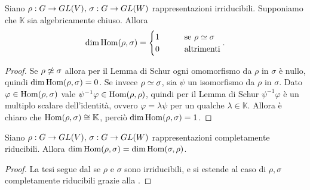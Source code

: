 \begin{corollary}
Siano $\rho:G\to GL(V),\,\allowbreak\sigma:G\to GL(W)$ rappresentazioni irriducibili. Supponiamo che $\mathbb{K}$ sia algebricamente chiuso. Allora
$$
\dim\operatorname{Hom}(\rho,\sigma)=
\begin{cases}
1\qquad&\text{se $\rho\simeq\sigma$}\\
0\qquad&\text{altrimenti}
\end{cases}.
$$
\end{corollary}
\begin{proof}
Se $\rho\not\simeq\sigma$ allora per il Lemma di Schur ogni omomorfismo da $\rho$ in $\sigma$ è nullo, quindi $\dim\operatorname{Hom}(\rho,\sigma)=0$. Se invece $\rho\simeq\sigma$, sia $\psi$ un isomorfismo da $\rho$ in $\sigma$. Dato $\varphi\in\operatorname{Hom}(\rho,\sigma)$ vale $\psi^{-1}\varphi\in\operatorname{Hom}(\rho,\rho)$, quindi per il Lemma di Schur $\psi^{-1}\varphi$ è un multiplo scalare dell'identità, ovvero $\varphi=\lambda\psi$ per un qualche $\lambda\in\mathbb{K}$. Allora è chiaro che $\operatorname{Hom}(\rho,\sigma)\cong\mathbb{K}$, perciò $\dim\operatorname{Hom}(\rho,\sigma)=1$.
\end{proof}

\begin{corollary}
Siano $\rho:G\to GL(V),\,\allowbreak\sigma:G\to GL(W)$ rappresentazioni completamente riducibili. Allora $\dim\operatorname{Hom}(\rho,\sigma)=\dim\operatorname{Hom}(\sigma,\rho)$.
\end{corollary}
\begin{proof}
La tesi segue dal  se $\rho$ e $\sigma$ sono irriducibili, e si estende al caso di $\rho\comma\sigma$ completamente riducibili grazie alla .
\end{proof}

